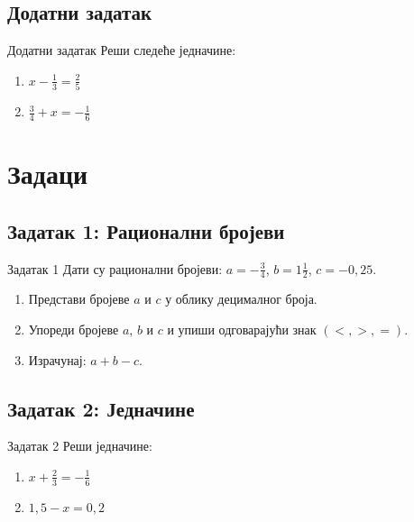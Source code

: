 \documentclass[11pt]{beamer}
\begin{document}
\subsection{Додатни задатак}
\begin{frame}{Додатни задатак}
    Реши следеће једначине:
    \begin{enumerate}
        \item $x - \frac{1}{3} = \frac{2}{5}$
        \item $\frac{3}{4} + x = -\frac{1}{6}$
    \end{enumerate}
\end{frame}

\section{Задаци}

\subsection{Задатак 1: Рационални бројеви}
\begin{frame}{Задатак 1}
    Дати су рационални бројеви:
    $a = -\frac{3}{4}$,
    $b = 1\frac{1}{2}$,
    $c = -0,\!25$.
    \begin{enumerate}
        \item Представи бројеве $a$ и $c$ у облику децималног броја.
        \item Упореди бројеве $a$, $b$ и $c$ и упиши одговарајући знак $(<, >, =)$.
        \item Израчунај: $a + b - c$.
    \end{enumerate}
\end{frame}

\subsection{Задатак 2: Једначине}
\begin{frame}{Задатак 2}
    Реши једначине:
    \begin{enumerate}
        \item $x + \frac{2}{3} = -\frac{1}{6}$
        \item $1,\!5 - x = 0,\!2$
    \end{enumerate}
\end{frame}
\end{document}
